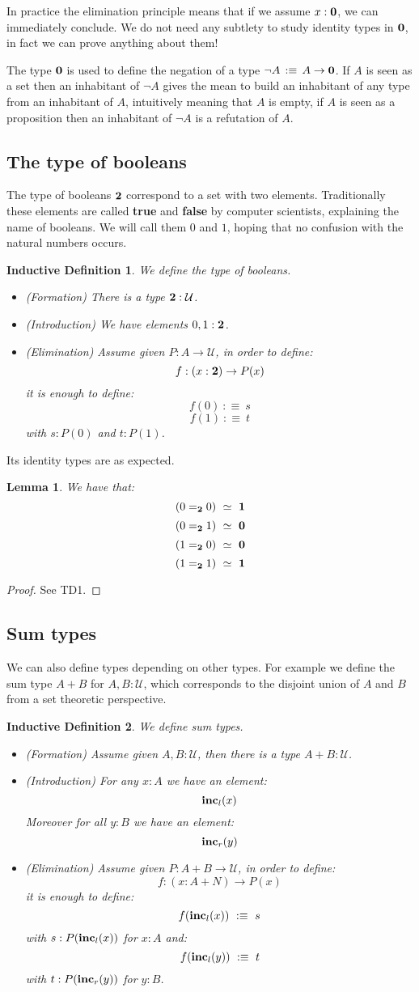 \documentclass{article}
\newcommand{\sse}[1]{\medbreak \subsection{#1}}
\newcommand{\U}{{\mathcal U}}
\renewcommand{\r}{\rightarrow}
\newcommand{\one}{{\bf 1}}
\newcommand{\zero}{{\bf 0}}
\newcommand{\two}{{\bf 2}}
\newcommand{\inc}{\mathrm{\bf inc}}
\newtheorem{lemma}{Lemma}
\newtheorem{ind_def}{Inductive Definition}
\begin{document}
In practice the elimination principle means that if we assume $x:\zero$, we can immediately conclude. We do not need any subtlety to study identity types in $\zero$, in fact we can prove anything about them! 

The type $\zero$ is used to define the negation of a type $\lnot A \,:\equiv\, A\r \zero$. If $A$ is seen as a set then an inhabitant of $\lnot A$ gives the mean to build an inhabitant of any type from an inhabitant of $A$, intuitively meaning that $A$ is empty, if $A$ is seen as a proposition then an inhabitant of $\lnot A$ is a refutation of $A$. %


\sse{The type of booleans}

The type of booleans $\two$ correspond to a set with two elements. Traditionally these elements are called {\bf true} and {\bf false} by computer scientists, explaining the name of booleans. We will call them $0$ and $1$, hoping that no confusion with the natural numbers occurs.

\begin{ind_def}
We define the type of booleans.
\begin{itemize}
\item (Formation) There is a type $\two:\U$.
\item (Introduction) We have elements $0,1:\two$.
\item (Elimination) Assume given $P:A\r \U$, in order to define:
\[f:(x:\two)\r P(x)\]
it is enough to define:
\[f(0) \ :\equiv\ s\]
\[f(1) \ :\equiv\ t\]
with $s:P(0)$ and $t:P(1)$.
\end{itemize}
\end{ind_def}

Its identity types are as expected.

\begin{lemma}
We have that:
\[(0=_\two0) \ \simeq \ \one\]
\[(0=_\two1) \ \simeq \ \zero\]
\[(1=_\two0) \ \simeq \ \zero\]
\[(1=_\two1) \ \simeq \ \one\]
\end{lemma}
\begin{proof}
See TD1.
\end{proof}


\sse{Sum types}

We can also define types depending on other types. For example we define the sum type $A+B$ for $A,B:\U$, which corresponds to the disjoint union of $A$ and $B$ from a set theoretic perspective.

\begin{ind_def}
We define sum types.
\begin{itemize}
\item (Formation) Assume given $A,B:\U$, then there is a type $A+B:\U$.
\item (Introduction) For any $x:A$ we have an element:
\[\inc_l(x)\]
Moreover for all $y:B$ we have an element:
\[\inc_r(y)\]
\item (Elimination) Assume given $P:A+B\r \U$, in order to define:
\[f:(x:A+N)\r P(x)\]
it is enough to define:
\[f(\inc_l(x)) \ :\equiv\ s\]
with $s:P(\inc_l(x))$ for $x:A$ and:
\[f(\inc_l(y)) \ :\equiv\ t\]
with $t:P(\inc_r(y))$ for $y:B$.
\end{itemize}
\end{ind_def}
\end{document}
